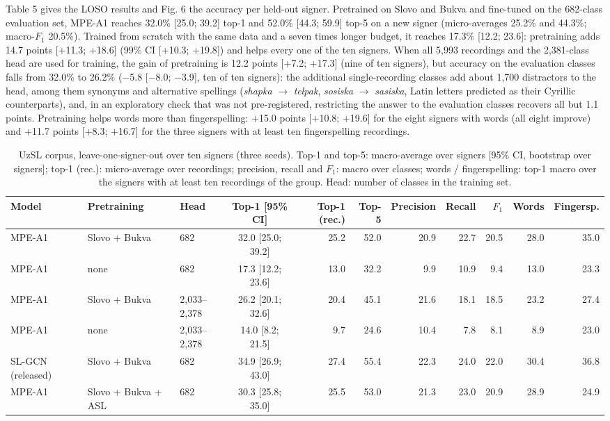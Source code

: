 \documentclass[a4paper,fleqn]{cas-dc}
\begin{document}
Table 5 gives the LOSO results and Fig. 6 the accuracy per held-out signer. Pretrained on Slovo and Bukva and fine-tuned on the 682-class evaluation set, MPE-A1 reaches 32.0\% {[}25.0; 39.2{]} top-1 and 52.0\% {[}44.3; 59.9{]} top-5 on a new signer (micro-averages 25.2\% and 44.3\%; macro-\(F_1\) 20.5\%). Trained from scratch with the same data and a seven times longer budget, it reaches 17.3\% {[}12.2; 23.6{]}: pretraining adds 14.7 points {[}+11.3; +18.6{]} (99\% CI {[}+10.3; +19.8{]}) and helps every one of the ten signers. When all 5,993 recordings and the 2,381-class head are used for training, the gain of pretraining is 12.2 points {[}+7.2; +17.3{]} (nine of ten signers), but accuracy on the evaluation classes falls from 32.0\% to 26.2\% ($-$5.8 {[}$-$8.0; $-$3.9{]}, ten of ten signers): the additional single-recording classes add about 1,700 distractors to the head, among them synonyms and alternative spellings (\emph{shapka} $\rightarrow$ \emph{telpak}, \emph{sosiska} $\rightarrow$ \emph{sasiska}, Latin letters predicted as their Cyrillic counterparts), and, in an exploratory check that was not pre-registered, restricting the answer to the evaluation classes recovers all but 1.1 points. Pretraining helps words more than fingerspelling: +15.0 points {[}+10.8; +19.6{]} for the eight signers with words (all eight improve) and +11.7 points {[}+8.3; +16.7{]} for the three signers with at least ten fingerspelling recordings.

\begin{table}[t]
\caption{UzSL corpus, leave-one-signer-out over ten signers (three seeds). Top-1 and top-5: macro-average over signers [95\% CI, bootstrap over signers]; top-1 (rec.): micro-average over recordings; precision, recall and $F_1$: macro over classes; words / fingerspelling: top-1 macro over the signers with at least ten recordings of the group. Head: number of classes in the training set.}\label{tab:loso}
\scriptsize\setlength{\tabcolsep}{3pt}
\centering
\begin{tabular}{lllcrrrrrrr}
\toprule
\textbf{Model} & \textbf{Pretraining} & \textbf{Head} & \textbf{Top-1 [95\% CI]} & \textbf{Top-1 (rec.)} & \textbf{Top-5} & \textbf{Precision} & \textbf{Recall} & \textbf{$F_1$} & \textbf{Words} & \textbf{Fingersp.} \\
\midrule
MPE-A1 & Slovo + Bukva & 682 & 32.0 [25.0; 39.2] & 25.2 & 52.0 & 20.9 & 22.7 & 20.5 & 28.0 & 35.0 \\
MPE-A1 & none & 682 & 17.3 [12.2; 23.6] & 13.0 & 32.2 & 9.9 & 10.9 & 9.4 & 13.0 & 23.3 \\
MPE-A1 & Slovo + Bukva & 2,033–2,378 & 26.2 [20.1; 32.6] & 20.4 & 45.1 & 21.6 & 18.1 & 18.5 & 23.2 & 27.4 \\
MPE-A1 & none & 2,033–2,378 & 14.0 [8.2; 21.5] & 9.7 & 24.6 & 10.4 & 7.8 & 8.1 & 8.9 & 23.0 \\
SL-GCN (released) & Slovo + Bukva & 682 & 34.9 [26.9; 43.0] & 27.4 & 55.4 & 22.3 & 24.0 & 22.0 & 30.4 & 36.8 \\
MPE-A1 & Slovo + Bukva + ASL & 682 & 30.3 [25.8; 35.0] & 25.5 & 53.0 & 21.3 & 23.0 & 20.9 & 28.9 & 24.9 \\
\bottomrule
\end{tabular}
\end{table}
\end{document}
